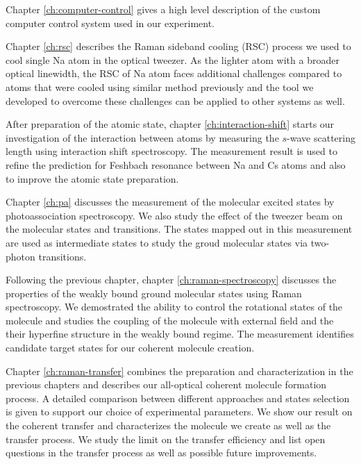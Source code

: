 Chapter \ref{ch:computer-control} gives a high level description of the custom
computer control system used in our experiment.

Chapter \ref{ch:rsc} describes the Raman sideband cooling (RSC) process
we used to cool single Na atom in the optical tweezer.
As the lighter atom with a broader optical linewidth,
the RSC of Na atom faces additional challenges compared to atoms
that were cooled using similar method previously
and the tool we developed to overcome these challenges can be applied to other systems as well.

After preparation of the atomic state,
chapter \ref{ch:interaction-shift} starts our investigation of the interaction between atoms
by measuring the $s$-wave scattering length using interaction shift spectroscopy.
The measurement result is used to refine the prediction for Feshbach resonance
between Na and Cs atoms and also to improve the atomic state preparation.

Chapter \ref{ch:pa} discusses the measurement of the molecular excited states
by photoassociation spectroscopy.
We also study the effect of the tweezer beam on the molecular states and transitions.
The states mapped out in this measurement are used as intermediate states
to study the groud molecular states via two-photon transitions.

Following the previous chapter, chapter \ref{ch:raman-spectroscopy} discusses
the properties of the weakly bound ground molecular states using Raman spectroscopy.
We demostrated the ability to control the rotational states of the molecule
and studies the coupling of the molecule with external field
and the their hyperfine structure in the weakly bound regime.
The measurement identifies candidate target states for our coherent molecule creation.

Chapter \ref{ch:raman-transfer} combines the preparation and characterization
in the previous chapters and describes our all-optical coherent molecule formation process.
A detailed comparison between different approaches and states selection is given
to support our choice of experimental parameters.
We show our result on the coherent transfer and characterizes
the molecule we create as well as the transfer process.
We study the limit on the transfer efficiency
and list open questions in the transfer process
as well as possible future improvements.
